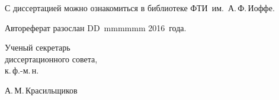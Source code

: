 \vspace{15mm}
\noindent С диссертацией можно ознакомиться в библиотеке ФТИ~им.~А.\,Ф.\,Иоффе.

\vspace{15mm}
\noindent Автореферат разослан DD~mmmmmm 2016~года.

\vspace{15mm}
\noindent %
\parbox[b][][b]{0.35\textwidth}{Ученый секретарь\\диссертационного совета,\\к.\,ф.-м.\,н.} 
\hfill
\parbox[b][][b]{0.6\textwidth}{{
\par}
{\hfill А.\,М.\,Красильщиков}}

\newpage